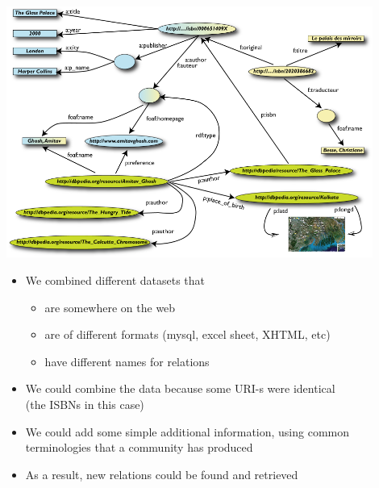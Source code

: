 \documentclass[a4paper,landscape,headrule,footrule,xetex]{foils}
\begin{document}
\noindent
\includegraphics[width=0.9\textwidth]{../pics/img31.png}



\begin{itemize}
\item We combined different datasets that
  \begin{itemize}
  \item are somewhere on the web
  \item are of different formats (mysql, excel sheet, XHTML, etc)
  \item have different names for relations
  \end{itemize}
\item We could combine the data because some URI-s were identical
  \\  (the ISBNs in this case)
\item We could add some simple additional information, using common terminologies that a community has produced
\item As a result, new relations could be found and retrieved
\end{itemize}

\end{document}
